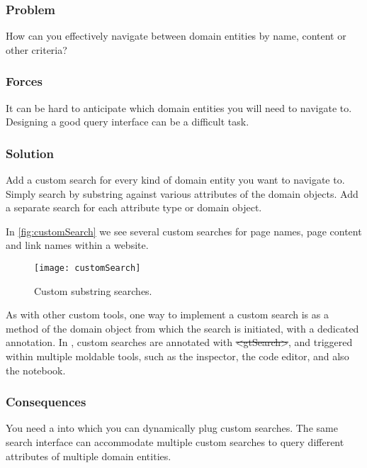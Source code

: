 \documentclass[sigconf]{acmart}
\renewcommand{\nbc}[3]{} %
\newcommand\eog[1]{\nbc{Edward}{#1}{purple}}
\newcommand{\pattern}[1]{\emph{\nameref{pat:#1}}\xspace}
\newcommand{\GT}{\lst{GT}\xspace} %
\begin{document}
\subsubsection*{Problem}
How can you effectively navigate between domain entities by name, content or other criteria?

\subsubsection*{Forces}
It can be hard to anticipate which domain  entities you will need to navigate to.
Designing a good query interface can be a difficult task.

\subsubsection*{Solution}
Add a custom search for every kind of domain entity you want to navigate to.
Simply search by substring against various attributes of the domain objects.
Add a separate search for each attribute type or domain object.

In \autoref{fig:customSearch} we see several custom searches for page names, page content and link names within a website.

\begin{figure}[h]
  \texttt{[image: customSearch]}
  \caption{Custom substring searches.}
  \label{fig:customSearch}
\end{figure}

\eog{I think what I was curious about is if there is a way to use an example of a domain specific custom search example, that would be really cool.
So I don't know, maybe something in ludo or like something more than just like researching.}

As with other custom tools, one way to implement a custom search is as a method of the domain object from which the search is initiated, with a dedicated annotation.
In \GT, custom searches are annotated with \st{<gtSearch>}, and triggered within multiple moldable tools, such as the inspector, the code editor, and also the notebook.

\subsubsection*{Consequences}
You need a \pattern{moldableTool} into which you can dynamically plug custom searches.
The same search interface can accommodate multiple custom searches to query different attributes of multiple domain entities.
\end{document}
